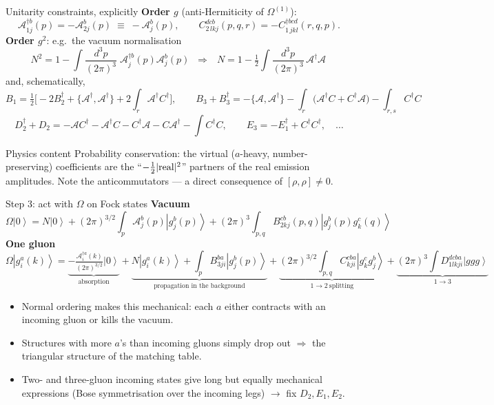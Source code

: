 \documentclass[9pt,aspectratio=169]{beamer}
\newcommand{\hl}[1]{\textcolor{acc}{#1}}
\newcommand{\hb}[1]{\textcolor{blu}{#1}}
\newcommand{\dthree}[1]{\frac{d^{3}#1}{(2\pi)^{3}}}
\newcommand{\Om}{\Omega}
\newcommand{\ket}[1]{\left|#1\right\rangle}
\begin{document}
\begin{frame}{Unitarity constraints, explicitly}
\textbf{Order $g$} (anti-Hermiticity of $\Om^{(1)}$):
\[
\mathcal{A}^{\dagger b}_{1j}(p)=-\mathcal{A}^{b}_{2j}(p)\;\equiv\;-\mathcal{A}^{b}_{j}(p),
\qquad
C^{dcb}_{2\,lkj}(p,q,r)=-C^{\dagger bcd}_{1\,jkl}(r,q,p).
\]
\medskip
\textbf{Order $g^{2}$}: e.g.\ the vacuum normalisation
\[
N^{2}=1-\int\!\dthree{p}\;\mathcal{A}^{\dagger b}_{j}(p)\mathcal{A}^{b}_{j}(p)
\;\;\Longrightarrow\;\;
\boxed{\,N=1-\tfrac12\!\int\!\dthree{p}\,\mathcal{A}^{\dagger}\mathcal{A}\,}
\]
and, schematically,
\[
B_{1}=\tfrac12\Big[-2B^{\dagger}_{2}+\{\mathcal{A}^{\dagger},\mathcal{A}^{\dagger}\}
+2\!\int_{r}\!\mathcal{A}^{\dagger}C^{\dagger}\Big],\qquad
B_{3}+B_{3}^{\dagger}=-\{\mathcal A,\mathcal A^\dagger\}-\int_r\!\big(\mathcal A^\dagger C+C^\dagger\mathcal A\big)-\int_{r,s}\! C^{\dagger}C
\]
\[
D_{2}^{\dagger}+D_{2}=-\mathcal{A}C^{\dagger}-\mathcal{A}^{\dagger}C-C^{\dagger}\mathcal{A}-C\mathcal{A}^{\dagger}-\int C^{\dagger}C,
\qquad
E_{3}=-E_{1}^{\dagger}+C^{\dagger}C^{\dagger},\quad\dots
\]
\vspace{-4pt}
\begin{alertblock}{Physics content}
Probability conservation: the virtual ($a$-heavy, number-preserving) coefficients are the
``$-\tfrac12|{\rm real}|^{2}$'' partners of the real emission amplitudes. Note the
\hb{anticommutators} --- a direct consequence of $[\rho,\rho]\neq0$.
\end{alertblock}
\end{frame}

\begin{frame}{Step 3: act with $\Omega$ on Fock states}
\textbf{Vacuum}
\[
\Om\ket0=N\ket0+(2\pi)^{3/2}\!\!\int_{p}\!\mathcal{A}^{b}_{j}(p)\ket{g^{b}_{j}(p)}
+(2\pi)^{3}\!\!\int_{p,q}\!B^{cb}_{2kj}(p,q)\ket{g^{b}_{j}(p)g^{c}_{k}(q)}
\]
\medskip
\textbf{One gluon}
\[
\Om\ket{g^{a}_{i}(k)}=
\underbrace{-\tfrac{\mathcal{A}^{\dagger a}_{i}(k)}{(2\pi)^{3/2}}\ket0}_{\text{absorption}}
+\underbrace{N\ket{g^{a}_{i}(k)}+\!\int_{p}\!B^{ba}_{3ji}\ket{g^{b}_{j}(p)}}_{\text{propagation in the background}}
+\underbrace{(2\pi)^{3/2}\!\!\int_{p,q}\!C^{cba}_{kji}\ket{g^{c}_{k}g^{b}_{j}}}_{1\to2\ \text{splitting}}
+\underbrace{(2\pi)^{3}\!\!\int\! D^{dcba}_{1lkji}\ket{ggg}}_{1\to3}
\]
\medskip
\begin{itemize}
  \item Normal ordering makes this mechanical: each $a$ either \hl{contracts with an incoming
        gluon} or kills the vacuum.
  \item Structures with more $a$'s than incoming gluons simply drop out
        $\Rightarrow$ the \hb{triangular} structure of the matching table.
  \item Two- and three-gluon incoming states give long but equally mechanical expressions
        (Bose symmetrisation over the incoming legs) $\to$ fix $D_{2},E_{1},E_{2}$.
\end{itemize}
\end{frame}
\end{document}

